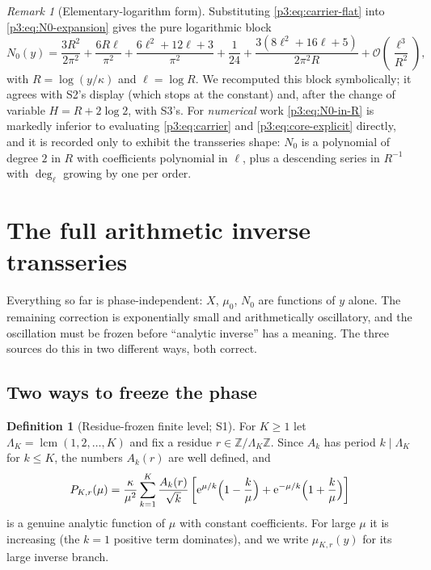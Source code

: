 \documentclass[11pt,a4paper,oneside]{book}
\theoremstyle{plain}
\theoremstyle{definition}
\newtheorem{definition}[theorem]{Definition}
\theoremstyle{remark}
\newtheorem{remark}[theorem]{Remark}
\newcommand{\Int}{\mathbb{Z}}
\newcommand{\e}{\mathrm{e}}
\newcommand{\bigO}{\mathcal{O}}
\begin{document}
\begin{remark}[Elementary-logarithm form]\label{p3:rem:N0-in-R}
Substituting \cref{p3:eq:carrier-flat} into \cref{p3:eq:N0-expansion} gives the pure logarithmic
block
\begin{equation}\label{p3:eq:N0-in-R}
 N_{0}(y)=\frac{3R^{2}}{2\pi^{2}}+\frac{6R\ell}{\pi^{2}}
 +\frac{6\ell^{2}+12\ell+3}{\pi^{2}}+\frac1{24}
 +\frac{3(8\ell^{2}+16\ell+5)}{2\pi^{2}R}
 +\bigO\!\left(\frac{\ell^{3}}{R^{2}}\right),
\end{equation}
with $R=\log(y/\kappa)$ and $\ell=\log R$. We recomputed this block symbolically; it agrees with
S2's display (which stops at the constant) and, after the change of variable $H=R+2\log2$, with
S3's. For \emph{numerical} work \cref{p3:eq:N0-in-R} is markedly inferior to evaluating
\cref{p3:eq:carrier} and \cref{p3:eq:core-explicit} directly, and it is recorded only to exhibit
the transseries shape: $N_{0}$ is a polynomial of degree $2$ in $R$ with coefficients polynomial
in $\ell$, plus a descending series in $R^{-1}$ with $\deg_{\ell}$ growing by one per order.
\end{remark}

\section{The full arithmetic inverse transseries}\label{p3:sec:full-inverse}

Everything so far is phase-independent: $X$, $\mu_{0}$, $N_{0}$ are functions of $y$ alone. The
remaining correction is exponentially small and arithmetically oscillatory, and the oscillation
must be frozen before ``analytic inverse'' has a meaning. The three sources do this in two
different ways, both correct.

\subsection{Two ways to freeze the phase}\label{p3:sub:two-freezings}

\begin{definition}[Residue-frozen finite level; S1]\label{p3:def:frozen}
For $K\ge1$ let $\Lambda_{K}=\operatorname{lcm}(1,2,\dots,K)$ and fix a residue
$r\in\Int/\Lambda_{K}\Int$. Since $A_{k}$ has period $k\mid\Lambda_{K}$ for $k\le K$, the numbers
$A_{k}(r)$ are well defined, and
\begin{equation}\label{p3:eq:PKr}
 P_{K,r}(\mu)=\frac{\kappa}{\mu^{2}}\sum_{k=1}^{K}\frac{A_{k}(r)}{\sqrt k}
 \left[\e^{\mu/k}\Bigl(1-\frac k\mu\Bigr)
      +\e^{-\mu/k}\Bigl(1+\frac k\mu\Bigr)\right]
\end{equation}
is a genuine analytic function of $\mu$ with constant coefficients. For large $\mu$ it is
increasing (the $k=1$ positive term dominates), and we write $\mu_{K,r}(y)$ for its large inverse
branch.
\end{definition}
\end{document}
